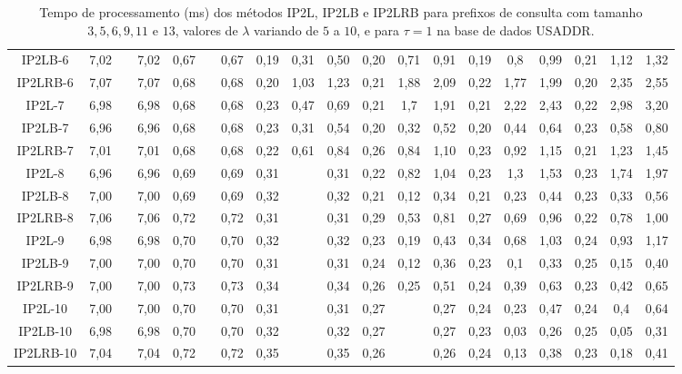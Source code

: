 \begin{table}[h]
{\begin{tabular}{c|ccc|ccc|ccc|ccc|ccc|ccc|}
\multicolumn{1}{|c|}{IP2LB-6}   & 7,02 &  & 7,02 & 0,67 &      & 0,67 & 0,19 & 0,31 & 0,50 & 0,20 & 0,71 & 0,91 & 0,19 & 0,8  & 0,99  & 0,21 & 1,12  & 1,32  \\
\multicolumn{1}{|c|}{IP2LRB-6}  & 7,07 &  & 7,07 & 0,68 &      & 0,68 & 0,20 & 1,03 & 1,23 & 0,21 & 1,88 & 2,09 & 0,22 & 1,77 & 1,99  & 0,20 & 2,35  & 2,55  \\ \hline
\multicolumn{1}{|c|}{IP2L-7}    & 6,98 &  & 6,98 & 0,68 &      & 0,68 & 0,23 & 0,47 & 0,69 & 0,21 & 1,7  & 1,91 & 0,21 & 2,22 & 2,43  & 0,22 & 2,98  & 3,20  \\
\multicolumn{1}{|c|}{IP2LB-7}   & 6,96 &  & 6,96 & 0,68 &      & 0,68 & 0,23 & 0,31 & 0,54 & 0,20 & 0,32 & 0,52 & 0,20 & 0,44 & 0,64  & 0,23 & 0,58  & 0,80  \\
\multicolumn{1}{|c|}{IP2LRB-7}  & 7,01 &  & 7,01 & 0,68 &      & 0,68 & 0,22 & 0,61 & 0,84 & 0,26 & 0,84 & 1,10 & 0,23 & 0,92 & 1,15  & 0,21 & 1,23  & 1,45  \\ \hline
\multicolumn{1}{|c|}{IP2L-8}    & 6,96 &  & 6,96 & 0,69 &      & 0,69 & 0,31 &      & 0,31 & 0,22 & 0,82 & 1,04 & 0,23 & 1,3  & 1,53  & 0,23 & 1,74  & 1,97  \\
\multicolumn{1}{|c|}{IP2LB-8}   & 7,00 &  & 7,00 & 0,69 &      & 0,69 & 0,32 &      & 0,32 & 0,21 & 0,12 & 0,34 & 0,21 & 0,23 & 0,44  & 0,23 & 0,33  & 0,56  \\
\multicolumn{1}{|c|}{IP2LRB-8}  & 7,06 &  & 7,06 & 0,72 &      & 0,72 & 0,31 &      & 0,31 & 0,29 & 0,53 & 0,81 & 0,27 & 0,69 & 0,96  & 0,22 & 0,78  & 1,00  \\ \hline
\multicolumn{1}{|c|}{IP2L-9}    & 6,98 &  & 6,98 & 0,70 &      & 0,70 & 0,32 &      & 0,32 & 0,23 & 0,19 & 0,43 & 0,34 & 0,68 & 1,03  & 0,24 & 0,93  & 1,17  \\
\multicolumn{1}{|c|}{IP2LB-9}   & 7,00 &  & 7,00 & 0,70 &      & 0,70 & 0,31 &      & 0,31 & 0,24 & 0,12 & 0,36 & 0,23 & 0,1  & 0,33  & 0,25 & 0,15  & 0,40  \\
\multicolumn{1}{|c|}{IP2LRB-9}  & 7,00 &  & 7,00 & 0,73 &      & 0,73 & 0,34 &      & 0,34 & 0,26 & 0,25 & 0,51 & 0,24 & 0,39 & 0,63  & 0,23 & 0,42  & 0,65  \\ \hline
\multicolumn{1}{|c|}{IP2L-10}   & 7,00 &  & 7,00 & 0,70 &      & 0,70 & 0,31 &      & 0,31 & 0,27 &      & 0,27 & 0,24 & 0,23 & 0,47  & 0,24 & 0,4   & 0,64  \\
\multicolumn{1}{|c|}{IP2LB-10}  & 6,98 &  & 6,98 & 0,70 &      & 0,70 & 0,32 &      & 0,32 & 0,27 &      & 0,27 & 0,23 & 0,03 & 0,26  & 0,25 & 0,05  & 0,31  \\
\multicolumn{1}{|c|}{IP2LRB-10} & 7,04 &  & 7,04 & 0,72 &      & 0,72 & 0,35 &      & 0,35 & 0,26 &      & 0,26 & 0,24 & 0,13 & 0,38  & 0,23 & 0,18  & 0,41  \\ \hline
\end{tabular}%
}
\caption{Tempo de processamento (ms) dos métodos IP2L, IP2LB e IP2LRB para prefixos de consulta com tamanho $3,5,6,9,11$ e $13$, valores de $\lambda$ variando de $5$ a $10$, e para $\tau=1$ na base de dados USADDR.}
\label{tab:methods-processing-time-tau-1-USADDR}
\end{table}


